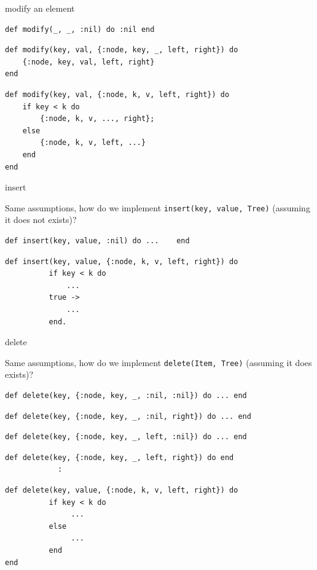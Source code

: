 \begin{frame}[fragile]{modify an element}

\begin{verbatim}
def modify(_, _, :nil) do :nil end
\end{verbatim}
\pause
\begin{verbatim}
def modify(key, val, {:node, key, _, left, right}) do 
    {:node, key, val, left, right}
end
\end{verbatim}
\pause
\begin{verbatim}
def modify(key, val, {:node, k, v, left, right}) do 
    if key < k do
        {:node, k, v, ..., right};
    else
        {:node, k, v, left, ...}
    end
end
\end{verbatim}

\end{frame}


\begin{frame}[fragile]{insert}

Same assumptions, how do we implement {\tt insert(key, value, Tree)} (assuming it does not exists)?

\pause\vspace{20pt}

\begin{verbatim}
def insert(key, value, :nil) do ...    end
\end{verbatim}
\pause
\begin{verbatim}
def insert(key, value, {:node, k, v, left, right}) do 
          if key < k do
              ... 
          true -> 
              ...
          end.
\end{verbatim}

\end{frame}


\begin{frame}[fragile]{delete}

Same assumptions, how do we implement {\tt delete(Item, Tree)} (assuming it does exists)?

\pause\vspace{20pt}

\begin{verbatim}
def delete(key, {:node, key, _, :nil, :nil}) do ... end
\end{verbatim}
\pause
\begin{verbatim}
def delete(key, {:node, key, _, :nil, right}) do ... end
\end{verbatim}
\pause
\begin{verbatim}
def delete(key, {:node, key, _, left, :nil}) do ... end
\end{verbatim}
\pause
\begin{verbatim}
def delete(key, {:node, key, _, left, right}) do end
            :
\end{verbatim}
\pause
\begin{verbatim}
def delete(key, value, {:node, k, v, left, right}) do 
          if key < k do
               ...
          else
               ...
          end
end
\end{verbatim}
\end{frame}

